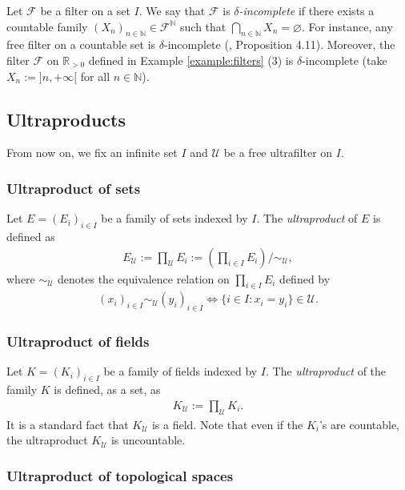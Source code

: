 \documentclass [11pt,reqno]{amsart}
\def\bN{{\mathbb{N}}}
\def\bR{{\mathbb{R}}}
\newcommand{\1}{\mathmybb{1}}
\def\cF{{\mathcal{F}}}
\def\cU{{\mathcal{U}}}
\def\emptyset{\varnothing}
\begin{document}
Let $\cF$ be a filter on a set $I$. We say that $\cF$ is $\delta$\emph{-incomplete} if there exists a countable family $(X_{n})_{n\in \bN}\in \cF^{\bN}$ such that $\bigcap_{n\in\bN}X_{n}=\emptyset$. For instance, any free filter on a countable set is $\delta$-incomplete (\cite{Vath07}, Proposition 4.11). Moreover, the filter $\cF$ on $\bR_{>0}$ defined in Example \ref{example:filters} (3) is $\delta$-incomplete (take $X_{n}:=]n,+\infty[$ for all $n\in \bN$).

\subsection{Ultraproducts}
\label{sub:ultraproducts}

From now on, we fix an infinite set $I$ and $\cU$ be a free ultrafilter on $I$. 

\subsubsection{Ultraproduct of sets}
\label{subsub:ultraproduct_sets}

Let $E=(E_{i})_{i\in I}$ be a family of sets indexed by $I$. The \emph{ultraproduct} of $E$ is defined as
\begin{align*}
E_{\cU} := \prod_{\cU}E_{i} := \left(\prod_{i\in I}E_{i}\right)/\sim_{\cU},
\end{align*}
where $\sim_{\cU}$ denotes the equivalence relation on $\prod_{i\in I}E_{i}$ defined by
\begin{align*}
(x_{i})_{i\in I} \sim_{\cU} (y_{i})_{i\in I} \Leftrightarrow \{i\in I : x_{i}=y_{i}\}\in \cU.
\end{align*}
 
\subsubsection{Ultraproduct of fields}
\label{subsub:ultraproduct_fields}

Let $K=(K_{i})_{i\in I}$ be a family of fields indexed by $I$. The \emph{ultraproduct} of the family $K$ is defined, as a set, as
\begin{align*}
K_{\cU} := \displaystyle\prod_{\cU} K_{i}.
\end{align*}
It is a standard fact that $K_{\cU}$ is a field. Note that even if the $K_{i}$'s are countable, the ultraproduct $K_{\cU}$ is uncountable.

\subsubsection{Ultraproduct of topological spaces}
\label{subsub:ultraproduct_topological_space}
\end{document}
